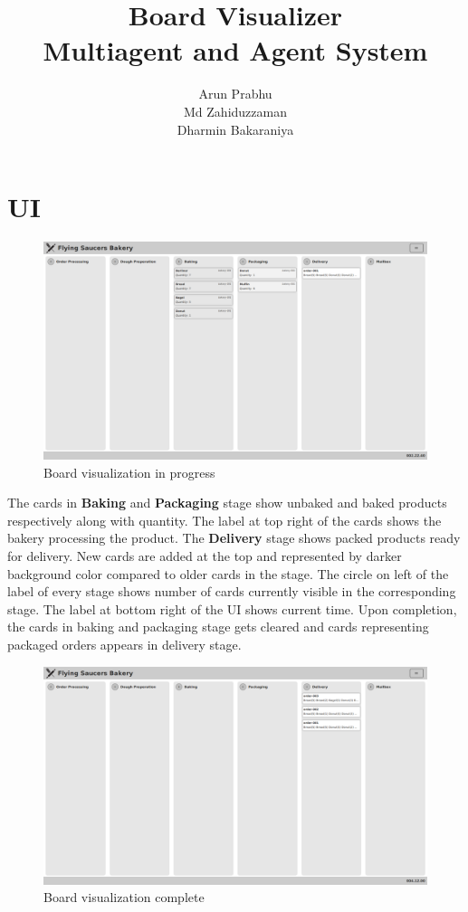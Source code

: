 \documentclass[12pt]{article}
\title{Board Visualizer\\Multiagent and Agent System}
\author{Arun Prabhu\\Md Zahiduzzaman\\Dharmin Bakaraniya}
\begin{document}
\maketitle{}
\pagebreak

\section{UI}
\begin{figure}[htpb]
	\centering
	\includegraphics[width=1.0\linewidth]{visualizer-ui.png}
	\caption{Board visualization in progress}
\end{figure}

The cards in \textbf{Baking} and \textbf{Packaging} stage show unbaked and baked products respectively along with quantity. The label at top right of the cards shows the bakery processing the product. The \textbf{Delivery} stage shows packed products ready for delivery. New cards are added at the top and represented by darker background color compared to older cards in the stage. The circle on left of the label of every stage shows number of cards currently visible in the corresponding stage. The label at bottom right of the UI shows current time. Upon completion, the cards in baking and packaging stage gets cleared and cards representing packaged orders appears in delivery stage.

\newpage
\begin{figure}[htpb]
	\centering
	\includegraphics[width=1.0\linewidth]{visualizer-complete.png}
	\caption{Board visualization complete}
\end{figure}
\end{document}
